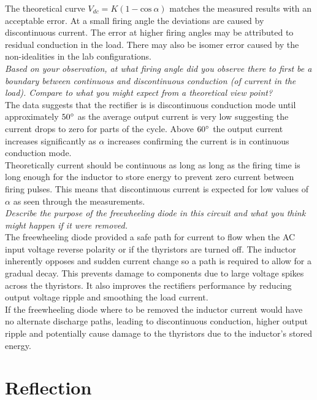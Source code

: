 \documentclass[12pt,a4paper]{article}
\begin{document}
The theoretical curve $V_{dc}=K(1-\mathrm{cos}\:\alpha)$ matches the measured results with an acceptable error. At a small firing angle the deviations are caused by discontinuous current. The error at higher firing angles may be attributed to residual conduction in the load. There may also be isomer error caused by the non-idealities in the lab configurations.\\

\textit{Based on your observation, at what firing angle did you observe there to first be a boundary between continuous and discontinuous conduction (of current in the load). Compare to what you might expect from a theoretical view point?}\\

The data suggests that the rectifier is is discontinuous conduction mode until approximately $50\degree$ as the average output current is very low suggesting the current drops to zero for parts of the cycle. Above $60\degree$ the output current increases significantly as $\alpha$ increases confirming the current is in continuous conduction mode.\\
Theoretically current should be continuous as long as long as the firing time is long enough for the inductor to store energy to prevent zero current between firing pulses. This means that discontinuous current is expected for low values of $\alpha$ as seen through the measurements.\\

\textit{Describe the purpose of the freewheeling diode in this circuit and what you think might happen if it were removed.}\\

The freewheeling diode provided a safe path for current to flow when the AC input voltage reverse polarity or if the thyristors are turned off. The inductor inherently opposes and sudden current change so a path is required to allow for a gradual decay. This prevents damage to components due to large voltage spikes across the thyristors. It also improves the rectifiers performance by reducing output voltage ripple and smoothing the load current.\\
If the freewheeling diode where to be removed the inductor current would have no alternate discharge paths, leading to discontinuous conduction, higher output ripple and potentially cause damage to the thyristors due to the inductor's stored energy.

\section{Reflection}
\end{document}
